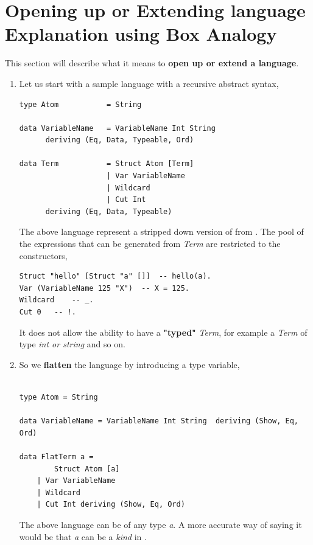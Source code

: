 \documentclass[thesis-solanki.tex]{subfiles}
\begin{document}
\clearpage

\section{Opening up or Extending language Explanation using Box Analogy}

This section will describe what it means to \textbf{open up or extend a language}. 

\begin{enumerate}
\item Let us start with a sample language with a recursive abstract syntax,
\begin{verbatim}
type Atom         	= String

data VariableName 	= VariableName Int String
      deriving (Eq, Data, Typeable, Ord)

data Term 			= Struct Atom [Term]
          			| Var VariableName
          			| Wildcard  
          			| Cut Int
      deriving (Eq, Data, Typeable)
\end{verbatim}

The above language represent a stripped down version of  from \cite{prolog-lib}. The pool of the expressions that can
be generated from \textit{Term} are restricted to the constructors,   

\begin{verbatim}
Struct "hello" [Struct "a" []] 	-- hello(a).
Var (VariableName 125 "X")	-- X = 125.
Wildcard	-- _.
Cut 0	-- !.
\end{verbatim}

It does not allow the ability to have a \textbf{"typed"} \textit{Term}, for example a \textit{Term} of type \textit{int or string} and
so on.


\item So we \textbf{flatten} the language by introducing a type variable,

\begin{verbatim}

type Atom = String

data VariableName = VariableName Int String  deriving (Show, Eq, Ord)

data FlatTerm a = 
		Struct Atom [a]
	| Var VariableName
	| Wildcard
	| Cut Int deriving (Show, Eq, Ord)

\end{verbatim}

The above language can be of any type \textit{a}. A more accurate way of saying it would be that \textit{a} can be a \textit{kind} in 
. 


\end{enumerate}
\end{document}
